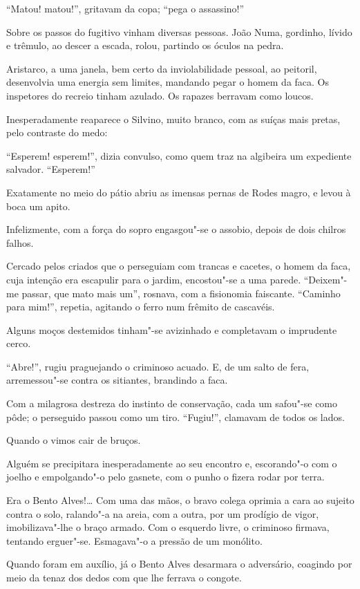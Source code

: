 ``Matou! matou!'', gritavam da copa; ``pega o assassino!''

Sobre os passos do fugitivo vinham diversas pessoas. João Numa,
gordinho, lívido e trêmulo, ao descer a escada, rolou, partindo os
óculos na pedra. 

Aristarco, a uma janela, bem certo da inviolabilidade
pessoal, ao peitoril, desenvolvia uma energia sem limites, mandando
pegar o homem da faca. Os inspetores do recreio tinham azulado. Os
rapazes berravam como loucos. 

Inesperadamente reaparece o Silvino,
muito branco, com as suíças mais pretas, pelo contraste do medo:

``Esperem! esperem!'', dizia convulso, como quem traz na algibeira um
expediente salvador. ``Esperem!'' 

Exatamente no meio do pátio abriu as
imensas pernas de Rodes magro, e levou à boca um apito. 

Infelizmente, com a força do sopro engasgou"-se o assobio, 
depois de dois chilros falhos. 

Cercado pelos criados que o perseguiam com trancas e cacetes, o
homem da faca, cuja intenção era escapulir para o jardim, encostou"-se
a uma parede. ``Deixem"-me passar, que mato mais um'', rosnava, com a
fisionomia faiscante. ``Caminho para mim!'', repetia, agitando o ferro num
frêmito de cascavéis. 

Alguns moços destemidos tinham"-se avizinhado e
completavam o imprudente cerco.

``Abre!'', rugiu praguejando o criminoso
acuado. E, de um salto de fera, arremessou"-se contra os sitiantes,
brandindo a faca. 

Com a milagrosa destreza do instinto de conservação,
cada um safou"-se como pôde; o perseguido passou como um tiro.
``Fugiu!'', clamavam de todos os lados. 

Quando o vimos cair de bruços.

Alguém se precipitara inesperadamente ao seu encontro e, escorando"-o
com o joelho e empolgando"-o pelo gasnete, com o punho o fizera rodar por
terra. 

Era o Bento Alves!\ldots{} Com uma das mãos, o bravo colega oprimia a
cara ao sujeito contra o solo, ralando"-a na areia, com a outra, por
um prodígio de vigor, imobilizava"-lhe o braço armado. Com o esquerdo
livre, o criminoso firmava, tentando erguer"-se. Esmagava"-o a
pressão de um monólito. 

Quando foram em auxílio, já o Bento Alves
desarmara o adversário, coagindo por meio da tenaz dos dedos com que
lhe ferrava o congote. 

